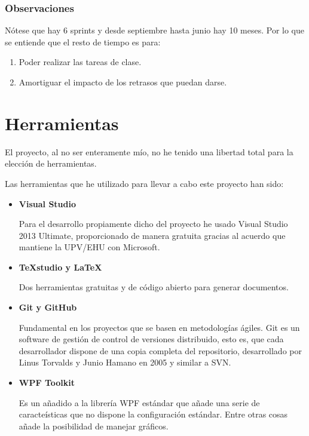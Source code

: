 \subsubsection{Observaciones}
N\'{o}tese que hay 6 sprints y desde septiembre hasta junio hay 10 meses. Por lo que se entiende que el resto de tiempo es para:
\begin{enumerate}
    \item Poder realizar las tareas de clase.
    \item Amortiguar el impacto de los retrasos que puedan darse.
\end{enumerate}

\section{Herramientas}
El proyecto, al no ser enteramente mío, no he tenido una libertad total para la elección de herramientas. 

Las herramientas que he utilizado para llevar a cabo este proyecto han sido:
\begin{itemize}
    \item 
    \textbf{Visual Studio}
    
    Para el desarrollo propiamente dicho del proyecto he usado Visual Studio 2013 Ultimate, proporcionado de manera gratuita gracias al acuerdo que mantiene la UPV/EHU con Microsoft.
    
    \item 
    \textbf{TeXstudio y \LaTeX}
    
    Dos herramientas gratuitas y de código abierto para generar documentos.
    
    \item
    \textbf{Git y GitHub}
    
    Fundamental en los proyectos que se basen en metodologías ágiles. Git es un software de gestión de control de versiones distribuido, esto es, que cada desarrollador dispone de una copia completa del repositorio, desarrollado por Linus Torvalds y Junio Hamano en 2005 y similar a SVN.
    
    \item
    \textbf{WPF Toolkit}
    
    Es un a\~{n}adido a la librer\'{i}a WPF est\'{a}ndar que a\~{n}ade una serie de caracte\'{i}sticas que no dispone la configuraci\'{o}n est\'{a}ndar.
    Entre otras cosas a\~{n}ade la posibilidad de manejar gr\'{a}ficos.
    
\end{itemize}

